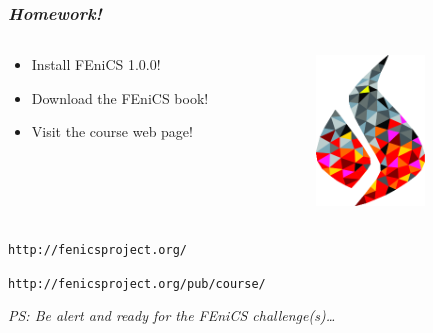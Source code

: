 \begin{frame}
  \frametitle{\emph{Homework!}}
  \normalsize

  \begin{columns}

    \begin{column}{0.6\textwidth}

      \begin{itemize}
      \item
        Install FEniCS 1.0.0!
      \item
        Download the FEniCS book!
      \item
        Visit the course web page!
      \end{itemize}

      \vspace{0.5cm}

    \end{column}

    \begin{column}{0.4\textwidth}
      \includegraphics[height=4cm]{png/fenics_logo.png}
    \end{column}

  \end{columns}

  \large
  \texttt{http://fenicsproject.org/}

  \bigskip

  \texttt{http://fenicsproject.org/pub/course/}

  \vfill

  \small
  \emph{PS: Be alert and ready for the FEniCS challenge(s)\ldots}

\end{frame}
